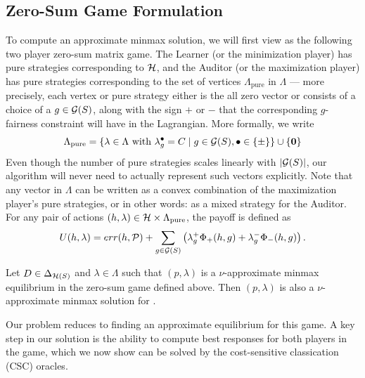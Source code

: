 \subsection{Zero-Sum Game Formulation}
To compute an approximate minmax solution, we will first view
 as the following two player zero-sum matrix game. The
Learner (or the minimization player) has pure strategies corresponding
to $\mathcal{H}$, and the Auditor (or the maximization player) has pure
strategies corresponding to the set of vertices
$\Lambda_{\text{pure}}$ in $\Lambda$ --- more precisely, each vertex
or pure strategy either is the all zero vector or consists of a choice
of a $g \in \mathcal{G}(S)$, along with the sign $+$ or $-$ that the
corresponding $g$-fairness constraint will have in the
Lagrangian. More formally, we write
\[
  \Lambda_{\text{pure}} = \{\lambda \in \Lambda \mbox{ with }
  \lambda_g^\bullet = C \mid g\in \mathcal{G}(S), \bullet \in \{\pm\}\} \cup
  \{\mathbf{0}\}
\]
Even though the number of pure strategies scales linearly with
$|\mathcal{G}(S)|$, our algorithm will never need to actually represent such
vectors explicitly.  Note that any vector in $\Lambda$ can be written
as a convex combination of the maximization player's pure strategies, or
in other words: as a mixed strategy for the Auditor. For any pair of
actions $(h, \lambda)\in \mathcal{H}\times \Lambda_{\text{pure}}$, the payoff
is defined as
\[
  U(h, \lambda) = err(h, \mathcal{P}) + \sum_{g\in \mathcal{G}(S)}
  \left(\lambda_g^+\Phi_+(h, g) + \lambda_g^-\Phi_-(h, g) \right).
\]

\begin{claim}
  Let $D\in \Delta_{\mathcal{H}(S)}$ and $\lambda\in \Lambda$ such that
  $(p, \lambda)$ is a $\nu$-approximate minmax equilibrium in the
  zero-sum game defined above. Then $(p, \lambda)$ is also a
  $\nu$-approximate minmax solution for .
\end{claim}

Our problem reduces to finding an approximate equilibrium for this
game. A key step in our solution is the ability to compute best
responses for both players in the game, which we now show can be
solved by the cost-sensitive classication (CSC) oracles.

